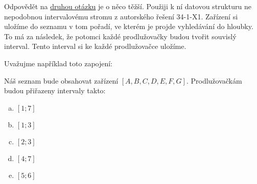\documentclass{article}
\begin{document}
Odpovědět na \hyperref[question:max]{druhou otázku} je o něco těžší. Použiji k ní datovou strukturu ne nepodobnou intervalovému stromu z autorského řešení 34-1-X1. Zařízení si uložíme do seznamu v tom pořadí, ve kterém je projde vyhledávání do hloubky. To má za následek, že potomci každé prodlužovačky budou tvořit souvislý interval. Tento interval si ke každé prodlužovačce uložíme.

Uvažujme například toto zapojení:

\begin{center}
\end{center}

Náš seznam bude obsahovat zařízení $\left[A, B, C, D, E, F, G\right]$. Prodlužovačkám budou přiřazeny intervaly takto:

\begin{enumerate}[a)]
    \item $\left[1; 7\right]$
    \item $\left[1; 3\right]$
    \item $\left[2; 3\right]$
    \item $\left[4; 7\right]$
    \item $\left[5; 6\right]$
\end{enumerate}
\end{document}

